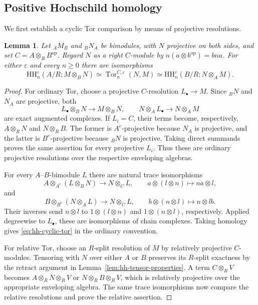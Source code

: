 \documentclass[12pt,a4paper,english,reqno]{amsart}
\numberwithin{equation}{section}
\theoremstyle{plain}
\newtheorem{lemma}[theorem]{Lemma}
\theoremstyle{definition}
\begin{document}
\subsection{Positive Hochschild homology}

We first establish a cyclic Tor comparison by means of projective
resolutions.

\begin{lemma}\label{lem:hh-cyclic-tor}
Let ${}_AM_B$ and ${}_BN_A$ be bimodules, with $N$ projective on both
sides, and set $C=A\otimes_R B^{\mathrm{op}}$.  Regard $N$ as a right
$C$-module by $n(a\otimes b^{\mathrm{op}})=bna$.  For either
$\varepsilon$ and every $n\geq0$ there are isomorphisms
\begin{equation}
 \mathrm{HH}^{\varepsilon}_n(A/R;M\otimes_BN)
 \simeq \operatorname{Tor}^{C,\varepsilon}_n(N,M)
 \simeq \mathrm{HH}^{\varepsilon}_n(B/R;N\otimes_AM).
 \label{eq:hh-cyclic-tor}
\end{equation}
\end{lemma}

\begin{proof}
For ordinary Tor, choose a projective
$C$-resolution $L_\bullet\to M$.  Since ${}_BN$ and $N_A$ are
projective, both
\[
 L_\bullet\otimes_BN\longrightarrow M\otimes_BN,
 \qquad
 N\otimes_AL_\bullet\longrightarrow N\otimes_AM
\]
are exact augmented complexes.  If $L_i=C$, their terms become,
respectively, $A\otimes_RN$ and $N\otimes_RB$.  The former is
$A^e$-projective because $N_A$ is projective, and the latter is
$B^e$-projective because ${}_BN$ is projective.  Taking direct
summands proves the same assertion for every projective $L_i$.
Thus these are ordinary projective resolutions over the respective
enveloping algebras.

For every $A$--$B$-bimodule $L$ there are natural trace isomorphisms
\[
 A\otimes_{A^e}(L\otimes_BN)
       \longrightarrow N\otimes_C L,
       \qquad a\otimes(l\otimes n)\longmapsto na\otimes l,
\]
and
\[
 B\otimes_{B^e}(N\otimes_AL)
       \longrightarrow N\otimes_C L,
       \qquad b\otimes(n\otimes l)\longmapsto n\otimes lb.
\]
Their inverses send $n\otimes l$ to $1\otimes(l\otimes n)$ and
$1\otimes(n\otimes l)$, respectively.  Applied degreewise to
$L_\bullet$, these are isomorphisms of chain complexes.  Taking
homology gives \eqref{eq:hh-cyclic-tor} in the ordinary convention.

For relative Tor, choose an $R$-split resolution of $M$
by relatively projective $C$-modules.  Tensoring with $N$ over either
$A$ or $B$ preserves its $R$-split exactness by the retract argument
in Lemma~\ref{lem:hh-tensor-properties}.  A term $C\otimes_RV$
becomes $A\otimes_RN\otimes_RV$ or
$N\otimes_RB\otimes_RV$, which is relatively projective over the
appropriate enveloping algebra.  The same trace isomorphisms now
compare the relative resolutions and prove the relative assertion.
\end{proof}
\end{document}
